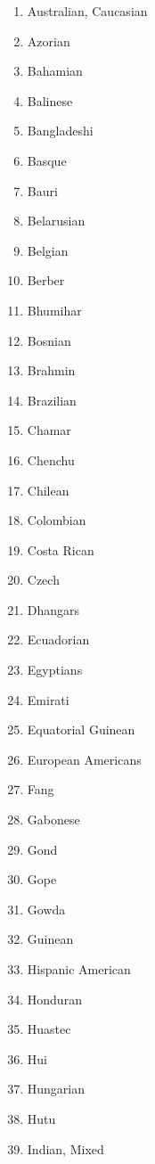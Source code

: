 {\begin{multicols}{4}
\begin{enumerate}
            \item Australian, Caucasian
            \item Azorian
            \item Bahamian
            \item Balinese
            \item Bangladeshi
            \item Basque
            \item Bauri
            \item Belarusian
            \item Belgian
            \item Berber
            \item Bhumihar
            \item Bosnian
            \item Brahmin
            \item Brazilian
            \item Chamar
            \item Chenchu
            \item Chilean
            \item Colombian
            \item Costa Rican
            \item Czech
            \item Dhangars
            \item Ecuadorian
            \item Egyptians
            \item Emirati
            \item Equatorial Guinean
            \item European Americans
            \item Fang
            \item Gabonese
            \item Gond
            \item Gope
            \item Gowda
            \item Guinean
            \item Hispanic American
            \item Honduran
            \item Huastec
            \item Hui
            \item Hungarian
            \item Hutu
            \item Indian, Mixed

\end{enumerate}
\end{multicols}}
